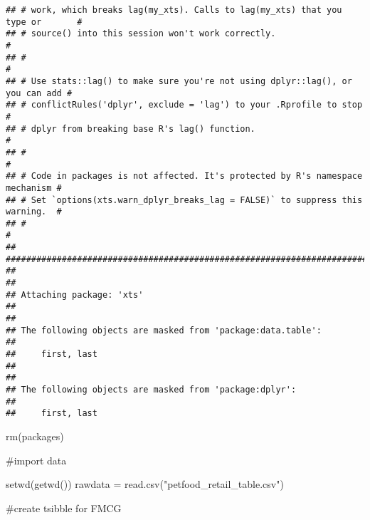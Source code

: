 \documentclass[
]{article}
\newenvironment{Shaded}{\begin{snugshade}}{\end{snugshade}}
\newcommand{\FunctionTok}[1]{\textcolor[rgb]{0.00,0.00,0.00}{#1}}
\newcommand{\NormalTok}[1]{#1}
\newcommand{\OtherTok}[1]{\textcolor[rgb]{0.56,0.35,0.01}{#1}}
\newcommand{\StringTok}[1]{\textcolor[rgb]{0.31,0.60,0.02}{#1}}
\begin{document}
\begin{verbatim}
## # work, which breaks lag(my_xts). Calls to lag(my_xts) that you type or       #
## # source() into this session won't work correctly.                            #
## #                                                                             #
## # Use stats::lag() to make sure you're not using dplyr::lag(), or you can add #
## # conflictRules('dplyr', exclude = 'lag') to your .Rprofile to stop           #
## # dplyr from breaking base R's lag() function.                                #
## #                                                                             #
## # Code in packages is not affected. It's protected by R's namespace mechanism #
## # Set `options(xts.warn_dplyr_breaks_lag = FALSE)` to suppress this warning.  #
## #                                                                             #
## ###############################################################################
## 
## 
## Attaching package: 'xts'
## 
## 
## The following objects are masked from 'package:data.table':
## 
##     first, last
## 
## 
## The following objects are masked from 'package:dplyr':
## 
##     first, last
\end{verbatim}

\begin{Shaded}
\begin{Highlighting}[]
\FunctionTok{rm}\NormalTok{(packages)}
\end{Highlighting}
\end{Shaded}

\#import data

\begin{Shaded}
\begin{Highlighting}[]
\FunctionTok{setwd}\NormalTok{(}\FunctionTok{getwd}\NormalTok{())}
\NormalTok{rawdata }\OtherTok{=} \FunctionTok{read.csv}\NormalTok{(}\StringTok{"petfood\_retail\_table.csv"}\NormalTok{)}
\end{Highlighting}
\end{Shaded}

\#create tsibble for FMCG
\end{document}
